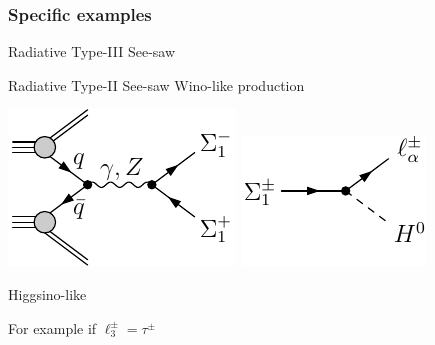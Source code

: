 \documentclass[%
xcolor=dvipsnames,table%
]{beamer}
\begin{document}
\begin{frame}
  \frametitle{Specific examples}
  Radiative Type-III See-saw

Radiative Type-II See-saw
Wino-like production 

\includegraphics[scale=1]{rsiii_prod}\hspace{1cm}
\includegraphics[scale=1]{rsiii_decay}

Higgsino-like 

For example if $\ell_3^{\pm}=\tau^{\pm}$

\end{frame}
\end{document}
